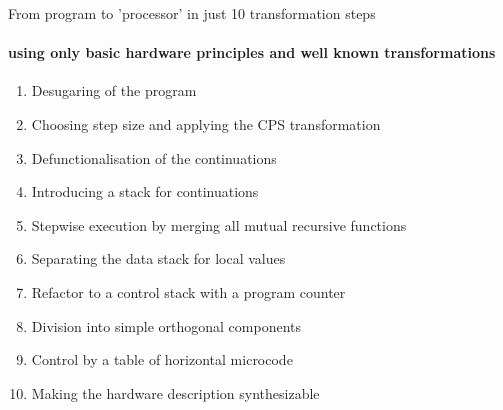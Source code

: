 \documentclass[pdf]{beamer}
\begin{document}
\begin{frame}{From program to 'processor' in just 10 transformation steps}
\framesubtitle{using only basic hardware principles and well known transformations}
\begin{block}{}
\begin{enumerate}
 \item Desugaring of the program
 \item Choosing step size and applying the CPS transformation
 \item Defunctionalisation of the continuations
 \item Introducing a stack for continuations
 \item Stepwise execution by merging all mutual recursive functions
 \item Separating the data stack for local values
 \item Refactor to a control stack with a program counter
 \item Division into simple orthogonal components

 \item Control by a table of horizontal microcode
 \item Making the hardware description synthesizable
\end{enumerate}
\end{block}


\end{frame}
\end{document}

